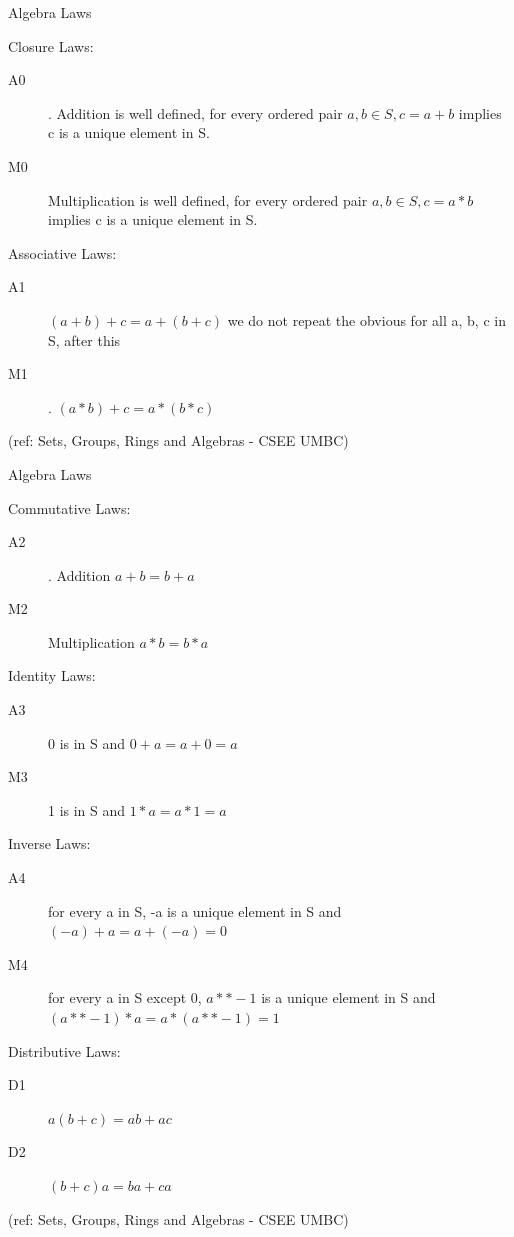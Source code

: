 \begin{frame}{Algebra Laws}

Closure Laws:
\begin{description}
\item[A0]. Addition is well defined, for every ordered pair
                      $a, b \in S, c = a+b$ implies c is a unique element in S.
\item[M0] Multiplication is well defined, for every ordered pair
                      $a, b \in S, c = a*b$ implies c is a unique element in S.
\end{description}

Associative Laws: 
\begin{description}
\item[A1] $(a+b)+c = a+(b+c)$  {we do not repeat the obvious  
                                          for all a, b, c in S, after this}
\item[M1]. $(a*b)+c = a*(b*c)$
\end{description}
					
									
\tiny{(ref: Sets, Groups, Rings and Algebras - CSEE UMBC)}

\end{frame}

\begin{frame}{Algebra Laws}

Commutative  Laws:
\begin{description}
\item[A2]. Addition $a+b = b+a$
\item[M2] Multiplication $a*b = b*a$
\end{description}

Identity  Laws:
\begin{description}
\item[A3] 0 is in S and  $0+a = a+0 = a $
\item[M3] 1 is in S and  $1*a = a*1 = a$
\end{description}
				
Inverse   Laws: 
\begin{description}
\item[A4]for every a in S, -a is a unique element in S and
                      $(-a)+a = a+(-a) = 0$
\item[M4] for every a in S except 0, $a**-1$ is a unique element in S
                      and $(a**-1)*a = a*(a**-1) = 1$
\end{description}				
									
Distributive    Laws: 
\begin{description}
\item[D1] $a(b+c) = ab + ac$
\item[D2] $(b+c)a = ba + ca$
\end{description}				
																		
\tiny{(ref: Sets, Groups, Rings and Algebras - CSEE UMBC)}

\end{frame}

